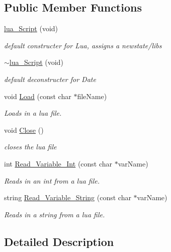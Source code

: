 \subsection*{Public Member Functions}
\begin{DoxyCompactItemize}
\item 
\hyperlink{classlua___script_abf302c385f1093b877c8a1ac9b080ecf}{lua\+\_\+\+Script} (void)
\begin{DoxyCompactList}\small\item\em default constructer for Lua, assigns a newstate/libs \end{DoxyCompactList}\item 
\hyperlink{classlua___script_a464a1ff7c13d51c248ce839c3b97f126}{$\sim$lua\+\_\+\+Script} (void)
\begin{DoxyCompactList}\small\item\em default deconstructer for Date \end{DoxyCompactList}\item 
void \hyperlink{classlua___script_a36a514765461a25d3b744eb2e5acff9d}{Load} (const char $\ast$file\+Name)
\begin{DoxyCompactList}\small\item\em Loads in a lua file. \end{DoxyCompactList}\item 
void \hyperlink{classlua___script_a798ee3f69134941da3938bfa2124e49f}{Close} ()
\begin{DoxyCompactList}\small\item\em closes the lua file \end{DoxyCompactList}\item 
int \hyperlink{classlua___script_a783ddef367f1029961f1686579eaa2d4}{Read\+\_\+\+Variable\+\_\+\+Int} (const char $\ast$var\+Name)
\begin{DoxyCompactList}\small\item\em Reads in an int from a lua file. \end{DoxyCompactList}\item 
string \hyperlink{classlua___script_a612e9ec89ff4f7f132d3ee1b2a2884ec}{Read\+\_\+\+Variable\+\_\+\+String} (const char $\ast$var\+Name)
\begin{DoxyCompactList}\small\item\em Reads in a string from a lua file. \end{DoxyCompactList}\end{DoxyCompactItemize}


\subsection{Detailed Description}


